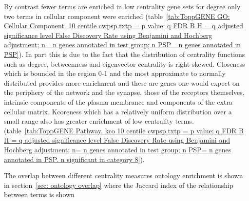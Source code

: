 By contrast fewer terms are enriched in low centrality gene sets for degree only two terms in cellular component were enriched (table~\ref{tab:ToppGENE GO: Cellular Component. 10 centile cwpsp.txtp = p value; q FDR B H = q adjusted significance level False Discovery Rate using Benjamini and Hochberg adjustment; n= n genes annotated in test group; n PSP= n genes annotated in PSP}). In part this is due to the fact that the distribution of centrality functions such as degree, betweenness and eigenvector centrality is right skewed. Closeness which is bounded in the region 0-1 and the most approximate to normally distributed provides more enrichment and these are genes one would expect on the periphery of the network and the synapse, those of the receptors themselves, intrinsic components of the plasma membrance and components of the extra cellular matrix. Kcoreness which has a relatively uniform distribution over a small range also has greater enrichment of low centrality terms.  (table~\ref{tab:ToppGENE Pathway. kco 10 centile cwpsp.txtp = p value; q FDR B H = q adjusted significance level False Discovery Rate using Benjamini and Hochberg adjustment; n= n genes annotated in test group; n PSP= n genes annotated in PSP. n significant in category 8}).

The overlap between different centrality measures ontology enrichment is shown in section~\ref{sec: ontology overlap} where the Jaccard index of the relationship between terms is shown


